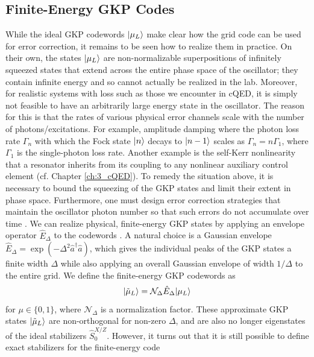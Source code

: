 \clearpage

\subsection{Finite-Energy GKP Codes}

While the ideal GKP codewords $\lvert\mu_L\rangle$ make clear how the grid code can be used for error correction, it remains to be seen how to realize them in practice. On their own, the states $\lvert\mu_L\rangle$ are non-normalizable superpositions of infinitely squeezed states that extend across the entire phase space of the oscillator; they contain infinite energy and so cannot actually be realized in the lab. Moreover, for realistic systems with loss such as those we encounter in cQED, it is simply not feasible to have an arbitrarily large energy state in the oscillator. The reason for this is that the rates of various physical error channels scale with the number of photons/excitations. For example, amplitude damping where the photon loss rate $\Gamma_n$ with which the Fock state $\lvert n\rangle$ decays to $\lvert n-1\rangle$ scales as $\Gamma_n = n\Gamma_1$, where $\Gamma_1$ is the single-photon loss rate. Another example is the self-Kerr nonlinearity that a resonator inherits from its coupling to any nonlinear auxiliary control element (cf. Chapter \ref{ch:3_cQED}). To remedy the situation above, it is necessary to bound the squeezing of the GKP states and limit their extent in phase space. Furthermore, one must design error correction strategies that maintain the oscillator photon number so that such errors do not accumulate over time \cite{campagne2020gkp-expt}. We can realize physical, finite-energy GKP states by applying an envelope operator $\hat{E}_\Delta$ to the codewords \cite{royer2020gkp}. A natural choice is a Gaussian envelope $\hat{E}_\Delta = \exp(-\Delta^2 \hat{a}^\dagger\hat{a})$, which gives the individual peaks of the GKP states a finite width $\Delta$ while also applying an overall Gaussian envelope of width $1/\Delta$ to the entire grid. We define the finite-energy GKP codewords as 
\begin{equation}
    \lvert\tilde{\mu}_L\rangle = \mathcal{N}_\Delta \hat{E}_\Delta \lvert\mu_L\rangle
\end{equation}
for $\mu \in \{0, 1\}$, where $\mathcal{N}_\Delta$ is a normalization factor. These approximate GKP states $\lvert\tilde{\mu}_L\rangle$ are non-orthogonal for non-zero $\Delta$, and are also no longer eigenstates of the ideal stabilizers $\hat{S}_0^{X/Z}$. However, it turns out that it is still possible to define exact stabilizers for the finite-energy code
